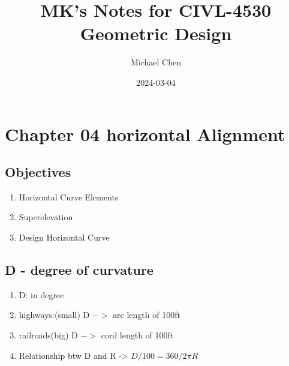 \documentclass{article}
\title{MK's Notes for CIVL-4530 Geometric Design}
\date{2024-03-04}
\author{Michael Chen}
\begin{document}
  \setcounter{page}{40}


  \tableofcontents
  \newpage


  \setcounter{section}{3}
  \section{Chapter 04 horizontal Alignment}
  \subsection{Objectives}
  \begin{enumerate}
    \item Horizontal Curve Elements
    \item Superelevation
    \item Design Horizontal Curve
  \end{enumerate}

  \subsection{D - degree of curvature}
  \begin{enumerate}
    \item D: in degree
    \item highways:(small) D $->$ arc length of 100ft
    \item railroads(big) D $->$ cord length of 100ft
    \item Relationship btw D and R -> $D / 100 = 360 / 2\pi R$
  \end{enumerate}

  
\end{document}
